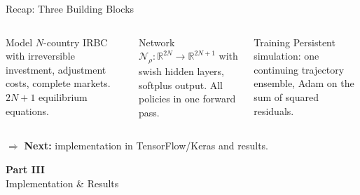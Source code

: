 \documentclass[aspectratio=169,11pt]{beamer}
\newcommand{\R}{\mathbb{R}}
\begin{document}
\begin{frame}{Recap: Three Building Blocks}
\begin{columns}[T]
\begin{block}{Model}
\centering
\small
$N$-country IRBC with irreversible investment, adjustment costs, complete markets. $2N+1$ equilibrium equations.
\end{block}

\begin{block}{Network}
\centering
\small
$\mathcal{N}_\rho: \R^{2N} \to \R^{2N+1}$ with swish hidden layers, softplus output. All policies in one forward pass.
\end{block}

\begin{block}{Training}
\centering
\small
Persistent simulation: one continuing trajectory ensemble, Adam on the sum of squared residuals.
\end{block}
\end{columns}

\vspace{0.8em}
\begin{center}
$\Rightarrow$ \textbf{Next:} implementation in TensorFlow/Keras and results.
\end{center}
\end{frame}


\begin{frame}{}
\vfill
\begin{center}
{\Huge \textcolor{uzhblue}{\textbf{Part III}}}\\[12pt]
{\LARGE Implementation \& Results}
\end{center}
\vfill
\end{frame}
\end{document}
